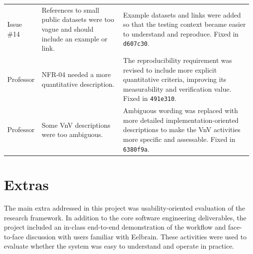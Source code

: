 \documentclass{article}
\begin{document}
\begin{table}[H]
\begin{tabularx}{0.96\textwidth}{p{1.8cm} p{4.2cm} X}
Issue \#14 &
References to small public datasets were too vague and should include an example or link. &
Example datasets and links were added so that the testing context became easier to understand and reproduce. Fixed in \texttt{d607c30}. \\

Professor &
NFR-04 needed a more quantitative description. &
The reproducibility requirement was revised to include more explicit quantitative criteria, improving its measurability and verification value. Fixed in \texttt{491e310}. \\

Professor &
Some VnV descriptions were too ambiguous. &
Ambiguous wording was replaced with more detailed implementation-oriented descriptions to make the VnV activities more specific and assessable. Fixed in \texttt{6380f9a}. \\

\bottomrule
\end{tabularx}
\end{table}


























\section{Extras}

The main extra addressed in this project was usability-oriented evaluation of the research framework.
In addition to the core software engineering deliverables, the project included an in-class end-to-end demonstration of the workflow and face-to-face discussion with users familiar with Eelbrain.
These activities were used to evaluate whether the system was easy to understand and operate in practice.
\end{document}
